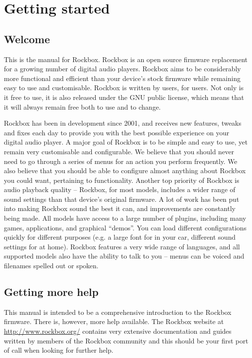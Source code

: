 \chapter{Getting started}
\section{Welcome}
This is the manual for Rockbox. Rockbox is an open source firmware replacement
for a growing number of digital audio players. Rockbox aims to be considerably
more functional and efficient than your device's stock firmware while remaining
easy to use and customisable. Rockbox is written by users, for users. Not only
is it free to use, it is also released under the GNU public license, which means
that it will always remain free both to use and to change.

Rockbox has been in development since 2001, and receives new features, tweaks
and fixes each day to provide you with the best possible experience on your
digital audio player. A major goal of Rockbox is to be simple and easy to use,
yet remain very customisable and configurable. We believe that you should never
need to go through a series of menus for an action you perform frequently. We
also believe that you should be able to configure almost anything about Rockbox
you could want, pertaining to functionality. Another top priority of Rockbox is
audio playback quality -- Rockbox, for most models, includes a wider range of
sound settings than that device's original firmware. A lot of work has been put
into making Rockbox sound the best it can, and improvements are constantly being
made. All models have access to a large number of plugins, including many games,
applications, and graphical ``demos''. You can load different configurations
quickly for different purposes (e.g. a large font for in your car, different
sound settings for at home). Rockbox features a very wide range of languages, and
all supported models also have the ability to talk to you -- menus can be voiced
and filenames spelled out or spoken.

\section{Getting more help}
This manual is intended to be a comprehensive introduction to the Rockbox
firmware. There is, however, more help available.  The Rockbox website at
\url{http://www.rockbox.org/} contains very extensive documentation and guides
written by members of the Rockbox community and this should be your first port
of call when looking for further help.

